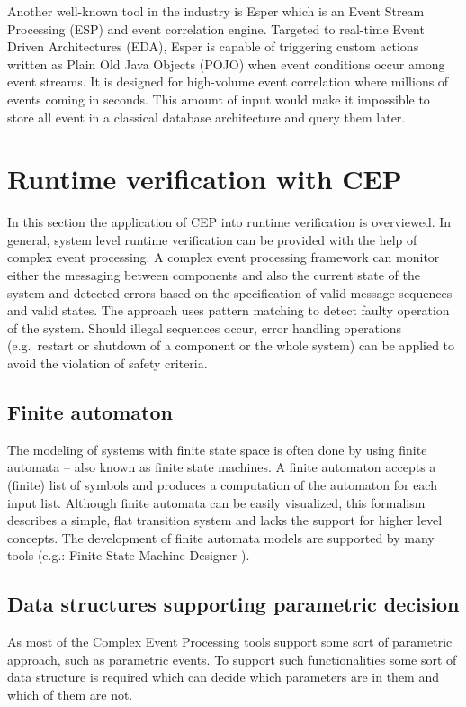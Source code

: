Another well-known tool in the industry is Esper\citep{esper} which is an Event Stream Processing (ESP) and event correlation engine.
Targeted to real-time Event Driven Architectures (EDA), Esper is capable of triggering custom actions written as Plain Old Java Objects (POJO) when event conditions occur among event streams. It is designed for high-volume event correlation where millions of events coming in seconds. This amount of input would make it impossible to store all event in a classical database architecture and query them later.

\section{Runtime verification with CEP}
In this section the application of CEP into runtime verification is overviewed.
In general, system level runtime verification can be provided with the help of complex event processing. A complex event processing framework can monitor either the messaging between components and also the current state of the system and detected errors based on the specification of valid message sequences and valid states. 
The approach uses pattern matching to detect faulty operation of the system. Should illegal sequences occur, error handling operations (e.g.~restart or shutdown of a component or the whole system) can be applied to avoid the violation of safety criteria.

\subsection{Finite automaton }

The modeling of systems with finite state space is often done by using finite automata -- also known as finite state machines. A finite automaton accepts a (finite) list of symbols and produces a computation of the automaton for each input list.
Although finite automata can be easily visualized, this formalism describes a simple, flat transition system and lacks the support for higher level concepts. The development of finite automata models are supported by many tools (e.g.: Finite State Machine Designer \citep{fsmd}).

\subsection{Data structures supporting parametric decision}
As most of the Complex Event Processing tools support some sort of parametric approach, such as parametric events.
To support such functionalities some sort of data structure is required which can decide which parameters are in them and which of them are not.

